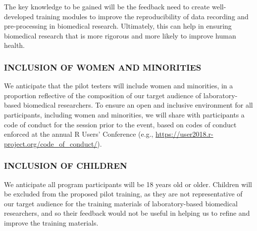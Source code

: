 \documentclass[pdftex,english,11.5pt,parskip=half]{scrartcl}
\begin{document}
The 
key knowledge to be gained will be the feedback need to create well-developed training modules to improve the 
reproducibility of data recording and pre-processing in biomedical research. 
Ultimately, this can help in ensuring biomedical research that is more 
rigorous and more likely to improve human health.

\subsubsection*{INCLUSION OF WOMEN AND MINORITIES}

We anticipate that the pilot testers will include women and minorities, in a 
proportion reflective of the composition of our target audience of laboratory-based
biomedical researchers. To ensure an open and inclusive environment for all 
participants, including women and minorities, we will share with participants a 
code of conduct for the session prior to the event, based on codes of conduct 
enforced at the annual R Users' Conference (e.g., \url{https://user2018.r-project.org/code_of_conduct/}).

\subsubsection*{INCLUSION OF CHILDREN}

We anticipate all program participants will be 18 years old or older. Children will be excluded from the proposed pilot training, as they are not representative of our target audience for the training materials of laboratory-based biomedical researchers, and so their feedback would not be useful in helping us to refine and 
improve the training materials. 
\end{document}
